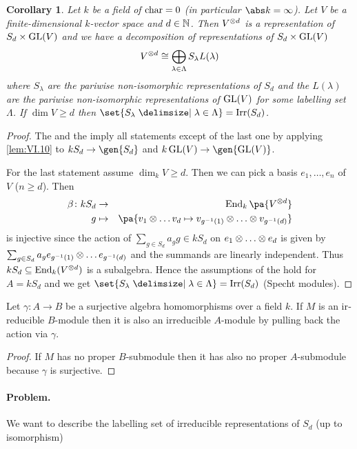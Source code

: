 \documentclass[12pt,a4paper]{scrartcl}
\theoremstyle{cplain}
\newtheorem{cor}[thmcounter]{Corollary}
\theoremstyle{cplain}
\theoremstyle{cplain}
\theoremstyle{definition}
\begin{document}
\begin{otherlanguage}{english}
\begin{cor}
  Let $k$ be a field of $\operatorname{char} = 0$ (in particular $\abs k =\infty$). Let $V$ be a finite-dimensional $k$-vector space and $d \in \mathbb N$. Then $V^{\otimes d}$ is a representation of $S_d \times \operatorname{GL}(V)$ and we have a decomposition of representations of $S_d \times \operatorname{GL}(V)$ \[V^{\otimes d} \cong \bigoplus_{\lambda \in \Lambda}S_\lambda L(\lambda) \] where $S_\lambda$ are the pariwise non-isomorphic representations of $S_d$ and the $L(\lambda)$ are the pariwise non-isomorphic representations of $\operatorname{GL}(V)$ for some labelling set $\Lambda$. If $\dim V \ge d$ then $\set{S_\lambda \given \lambda \in \Lambda} =\Irr(S_d)$. 
\end{cor}
\begin{proof}
  The  and the  imply all statements except of the last one by applying \cref{lem:VI.10} to $kS_d \to \gen{S_d}$ and $k\GL(V) \to \gen{\GL(V)}$.
  
  For the last statement assume $\dim_kV \ge d$. Then we can pick a basis $e_1,\ldots,e_n$ of $V$ ($n \ge d$). Then
  \begin{eqnarray*}
    \beta \colon kS_d &\to& \End_k\pa{V^{\tp d}} \\
    g &\mapsto& \pa{v_1 \tp \ldots v_d \mapsto v_{g^{-1}(1)} \tp \ldots \tp v_{g^{-1}(d)}}
  \end{eqnarray*}
  is injective since the action of $\sum_{g\in S_d} a_g g \in kS_d$ on $e_1 \otimes \ldots \otimes e_d$ is given by $\sum_{g \in S_d} a_ge_{g^{-1}(1)} \otimes \ldots e_{g^{-1}(d)}$ and the summands are linearly independent. Thus  $kS_d\subseteq \operatorname{End}_k(V^{\otimes d})$ is a subalgebra. Hence the assumptions of the  hold for $A = kS_d$ and we get $\set{S_\lambda\given \lambda\in\Lambda} = \Irr(S_d)$ (Specht modules). %
\end{proof}

\begin{lem} \label{lem:VI.10}
  Let $\gamma\colon A \to B$ be a surjective algebra homomorphisms over a field $k$. If $M$ is an irreducible $B$-module then it is also an irreducible $A$-module by pulling back the action via $\gamma$.
\end{lem}
\begin{proof}
  If $M$ has no proper $B$-submodule then it has also no proper $A$-submodule because $\gamma$ is surjective.
\end{proof}

\paragraph{Problem.}
We want to describe the labelling set of irreducible representations of $S_d$ (up to isomorphism)


\end{otherlanguage}
\end{document}
